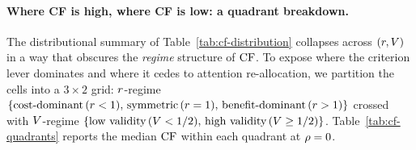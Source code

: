 \paragraph{Where CF is high, where CF is low: a quadrant breakdown.}
The distributional summary of Table~\ref{tab:cf-distribution}
collapses across $(r, V)$ in a way that obscures the
\emph{regime} structure of $\mathrm{CF}$. To expose where the criterion
lever dominates and where it cedes to attention re-allocation, we
partition the cells into a $3 \times 2$ grid: $r$-regime
$\{\text{cost-dominant}\,(r < 1),\, \text{symmetric}\,
(r = 1),\, \text{benefit-dominant}\,(r > 1)\}$ crossed
with $V$-regime $\{\text{low validity}\,(V < 1/2),\,
\text{high validity}\,(V \ge 1/2)\}$. Table~\ref{tab:cf-quadrants}
reports the median $\mathrm{CF}$ within each quadrant at $\rho = 0$.
%
